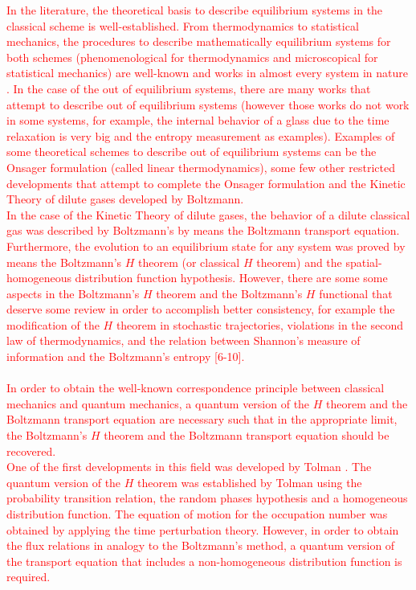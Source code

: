 \documentclass{article}
\begin{document}
\textcolor{red}{In the literature, the theoretical basis to describe equilibrium systems in the classical scheme is well-established. From thermodynamics to statistical mechanics, the procedures to describe mathematically equilibrium systems for both schemes (phenomenological for thermodynamics and microscopical for statistical mechanics) are well-known and works in almost every system in nature \cite{huang, reif, patrick}. In the case of the out of equilibrium systems, there are many works that attempt to describe out of equilibrium systems (however those works do not work in some systems, for example, the internal behavior of a glass due to the time relaxation is very big \cite{cristal1} and the entropy measurement \cite{cristal2, cristal3} as examples). Examples of some theoretical schemes to describe out of equilibrium systems can be the Onsager formulation (called linear thermodynamics), some few other restricted developments that attempt to complete the Onsager formulation \cite{kei, onsager} and the Kinetic Theory of dilute gases developed by Boltzmann.\\
In the case of the Kinetic Theory of dilute gases, the behavior of a dilute classical gas was described by Boltzmann's by means the Boltzmann transport equation. Furthermore, the evolution to an equilibrium state for any system was proved by means the Boltzmann's $H$ theorem (or classical $H$ theorem) and the spatial-homogeneous distribution function hypothesis.
However, there are some some aspects in the Boltzmann's $H$ theorem and the Boltzmann's $H$ functional that deserve some review in order to accomplish better consistency, for example the modification of the $H$ theorem in stochastic trajectories, violations in the second law of thermodynamics, and the relation between Shannon's measure of information and the Boltzmann's entropy  [6-10].\\ %
\\
In order to obtain the well-known correspondence principle between classical mechanics and quantum mechanics, a quantum version of the $H$ theorem and the Boltzmann transport equation are necessary such that in the appropriate limit, the  Boltzmann's $H$ theorem and the Boltzmann transport equation should be recovered.\\
One of the first developments in this field was developed by Tolman \cite{tolman}. The quantum version of the $H$ theorem was established by Tolman using the probability transition relation, the random phases hypothesis and a homogeneous distribution function. The equation of motion for the occupation number was obtained by applying the time perturbation theory. However, in order to obtain the flux relations in analogy to the Boltzmann's method, a quantum version of the transport equation that includes a non-homogeneous distribution function is required.\\
}
\end{document}
